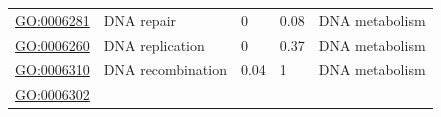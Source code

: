 \documentclass[
]{article}
\begin{document}
\begin{longtable}[]{@{}lllll@{}}
\begin{minipage}[t]{0.17\columnwidth}
\url{GO:0006281}\strut
\end{minipage} & \begin{minipage}[t]{0.17\columnwidth}\raggedright
DNA repair\strut
\end{minipage} & \begin{minipage}[t]{0.17\columnwidth}\raggedright
0\strut
\end{minipage} & \begin{minipage}[t]{0.17\columnwidth}\raggedright
0.08\strut
\end{minipage} & \begin{minipage}[t]{0.17\columnwidth}\raggedright
DNA metabolism\strut
\end{minipage}\tabularnewline
\begin{minipage}[t]{0.17\columnwidth}\raggedright
\url{GO:0006260}\strut
\end{minipage} & \begin{minipage}[t]{0.17\columnwidth}\raggedright
DNA replication\strut
\end{minipage} & \begin{minipage}[t]{0.17\columnwidth}\raggedright
0\strut
\end{minipage} & \begin{minipage}[t]{0.17\columnwidth}\raggedright
0.37\strut
\end{minipage} & \begin{minipage}[t]{0.17\columnwidth}\raggedright
DNA metabolism\strut
\end{minipage}\tabularnewline
\begin{minipage}[t]{0.17\columnwidth}\raggedright
\url{GO:0006310}\strut
\end{minipage} & \begin{minipage}[t]{0.17\columnwidth}\raggedright
DNA recombination\strut
\end{minipage} & \begin{minipage}[t]{0.17\columnwidth}\raggedright
0.04\strut
\end{minipage} & \begin{minipage}[t]{0.17\columnwidth}\raggedright
1\strut
\end{minipage} & \begin{minipage}[t]{0.17\columnwidth}\raggedright
DNA metabolism\strut
\end{minipage}\tabularnewline
\begin{minipage}[t]{0.17\columnwidth}\raggedright
\url{GO:0006302}\strut
\end{minipage} & \begin{minipage}[t]{0.17\columnwidth}\raggedright

\end{minipage}
\end{longtable}
\end{document}
